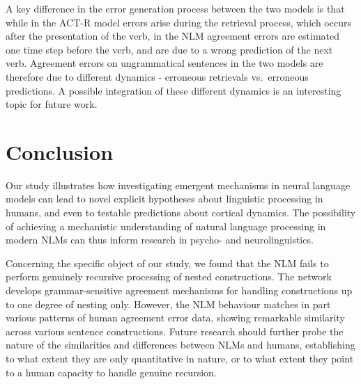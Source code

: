 A key difference in the error generation process between the two models is that while in the ACT-R model errors arise during the retrieval process, which occurs after the presentation of the verb, in the NLM agreement errors are estimated one time step before the verb, and are due to a wrong prediction of the next verb. Agreement errors on ungrammatical sentences in the two models are therefore due to different dynamics - erroneous retrievals vs.~erroneous predictions. A possible integration of these different dynamics is an interesting topic for future work.

\section{Conclusion}
Our study illustrates how investigating emergent mechanisms in neural language models can lead to novel explicit hypotheses about linguistic processing in humans, and even to testable predictions about cortical dynamics. The possibility of achieving a mechanistic understanding of natural language processing in modern NLMs can thus inform research in psycho- and neurolinguistics.

Concerning the specific object of our study, we found that the NLM fails to perform genuinely recursive processing of nested constructions. The network develops grammar-sensitive agreement mechanisms for handling  constructions up to one degree of nesting only. However, the NLM behaviour matches in part various patterns of human agreement error data, showing remarkable similarity across various sentence constructions. Future research should further probe the nature of the similarities and differences between NLMs and humans, establishing to what extent they are only quantitative in nature, or to what extent they point to a human capacity to handle genuine recursion.



